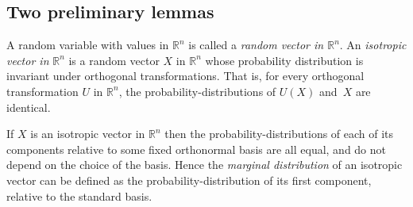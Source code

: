 \documentclass{article}[1100]
\theoremstyle{definition}
\theoremstyle{remark}
\newcommand\Ren[1]{\mathbb{R}^{#1}}
\begin{document}
\medskip
 

 \medskip
 \subsection*{Two preliminary lemmas}
 A random variable with values in $\Ren{n}$  
is called a \emph{random vector in $\Ren{n}$}. 
An \emph{isotropic vector in} $\Ren{n}$ is a random vector $X$ in $\Ren{n}$ whose probability distribution is invariant under orthogonal transformations. That is, 
for every orthogonal transformation $U$ in $\Ren{n}$, the probability-distributions of $U(X)$ and~$X$ are identical. 
\medskip

If $X$ is an isotropic  vector in $\Ren{n}$ then the probability-distributions of each of its components relative to some fixed orthonormal basis are all equal, and do not depend on the choice of the basis.
Hence the \emph{marginal distribution} of an isotropic vector can be defined as the probability-distribution of its first component, relative to the standard basis. \bigskip
\end{document}
